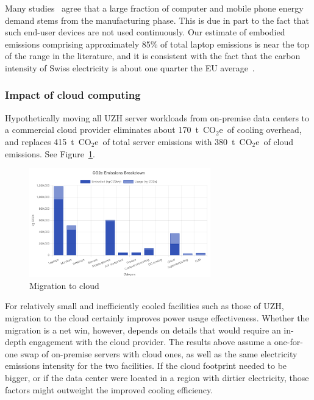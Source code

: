 \documentclass[11pt]{article}
\newcommand{\coe}{CO$_2$e}
\newcommand{\tcoe}{t~\coe}
\begin{document}
Many studies~\cite{wb:itu:ict,umich:factsheet} agree that a large fraction of computer and mobile phone energy demand stems from the manufacturing phase. This is due in part to the fact that such end-user devices are not used continuously. Our estimate of embodied emissions comprising approximately 85\% of total laptop emissions is near the top of the range in the literature, and it is consistent with the fact that the carbon intensity of Swiss electricity is about one quarter the EU average~\cite{electricitymaps}.

\subsubsection*{Impact of cloud computing}

Hypothetically moving all UZH server workloads from on-premise data centers to a commercial cloud provider eliminates about 170~\tcoe\ of cooling overhead, and replaces 415~\tcoe\ of total server emissions with 380~\tcoe\ of cloud emissions. See Figure~\ref{fig:cloud}.

\begin{figure}[h]
  \centering
  \includegraphics[width=0.7\textwidth]{fig-cloud.png}
  \caption{Migration to cloud}
  \label{fig:cloud}
\end{figure}

For relatively small and inefficiently cooled facilities such as those of UZH, migration to the cloud certainly improves power usage effectiveness. Whether the migration is a net win, however, depends on details that would require an in-depth engagement with the cloud provider. The results above assume a one-for-one swap of on-premise servers with cloud ones, as well as the same electricity emissions intensity for the two facilities. If the cloud footprint needed to be bigger, or if the data center were located in a region with dirtier electricity, those factors might outweight the improved cooling efficiency.
\end{document}
